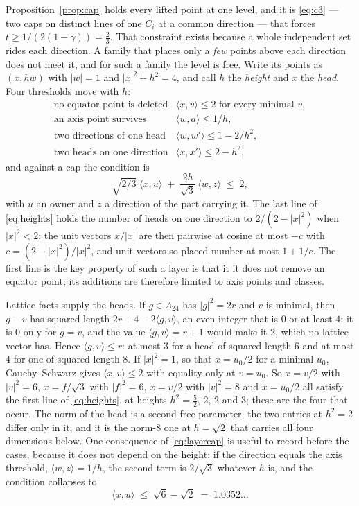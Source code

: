 \documentclass[11pt]{amsart}
\theoremstyle{remark}
\newcommand{\Leech}{\Lambda_{24}}
\newcommand{\ip}[2]{\langle #1,#2\rangle}
\begin{document}
Proposition~\ref{prop:cap} holds every lifted point at one level, and it is
\eqref{eq:c3} --- two caps on distinct lines of one $C_i$ at a common direction
--- that forces $t\ge1/(2(1-\gamma))=\tfrac23$. That constraint exists because a
whole independent set rides each direction. A family that places only a
\emph{few} points above each direction does not meet it, and for such a family
the level is free. Write its points as $(x,hw)$ with $|w|=1$ and
$|x|^{2}+h^{2}=4$, and call $h$ the \emph{height} and $x$ the \emph{head}. Four
thresholds move with $h$:
\begin{equation}\label{eq:heights}
\begin{array}{ll}
  \text{no equator point is deleted} & \ip{x}{v}\le2 \text{ for every minimal } v,\\[2pt]
  \text{an axis point survives}      & \ip{w}{a}\le1/h,\\[2pt]
  \text{two directions of one head}  & \ip{w}{w'}\le1-2/h^{2},\\[2pt]
  \text{two heads on one direction}  & \ip{x}{x'}\le2-h^{2},
\end{array}
\end{equation}
and against a cap the condition is
\begin{equation}\label{eq:layercap}
  \sqrt{2/3}\;\ip{x}{u}\;+\;\frac{2h}{\sqrt3}\,\ip{w}{z}\;\le\;2 ,
\end{equation}
with $u$ an owner and $z$ a direction of the part carrying it. The last line of
\eqref{eq:heights} holds the number of heads on one direction to
$2/(2-|x|^{2})$ when $|x|^{2}<2$: the unit vectors $x/|x|$ are then pairwise at
cosine at most $-c$ with $c=(2-|x|^{2})/|x|^{2}$, and unit vectors so placed
number at most $1+1/c$. The first line is the key property of such a layer is that it it
does not remove an equator point; its additions are therefore limited to axis points and classes.

Lattice facts supply the heads. If $g\in\Leech$ has $|g|^{2}=2r$ and $v$ is
minimal, then $g-v$ has squared length $2r+4-2\ip{g}{v}$, an even integer that
is $0$ or at least $4$; it is $0$ only for $g=v$, and the value
$\ip{g}{v}=r+1$ would make it $2$, which no lattice vector has. Hence
$\ip{g}{v}\le r$: at most $3$ for a head of squared length $6$ and at most $4$
for one of squared length $8$. If $|x|^{2}=1$, so that $x=u_{0}/2$ for a minimal
$u_{0}$, Cauchy--Schwarz gives $\ip{x}{v}\le2$ with equality only at
$v=u_{0}$. So $x=v/2$ with $|v|^{2}=6$, $x=f/\sqrt3$ with $|f|^{2}=6$,
$x=v/2$ with $|v|^{2}=8$ and $x=u_{0}/2$ all satisfy the first line of
\eqref{eq:heights}, at heights $h^{2}=\tfrac52$, $2$, $2$ and $3$; these are the
four that occur. The norm of the head is a second free parameter, the two
entries at $h^{2}=2$ differ only in it, and it is the norm-$8$ one at $h=\sqrt2$
that carries all four dimensions below. One consequence of \eqref{eq:layercap} is useful to record before the cases, because it does not depend on the height: if the
direction equals the axis threshold, $\ip{w}{z}=1/h$, the second term
is $2/\sqrt3$ whatever $h$ is, and the condition collapses to
\begin{equation}\label{eq:capthr}
  \ip{x}{u}\;\le\;\sqrt6-\sqrt2\;=\;1.0352\ldots
\end{equation}
\end{document}

